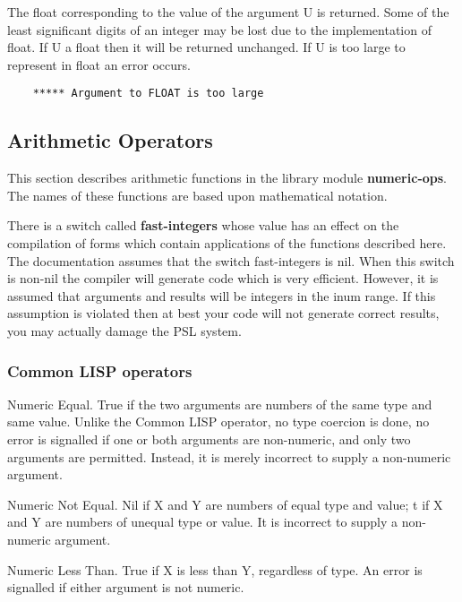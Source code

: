 {    The  float  corresponding  to the value of the argument U is
    returned.  Some  of  the  least  significant  digits  of  an
    integer  may be lost due to the implementation of float.  If
    U a float then it will be returned unchanged.  If U  is  too
    large to represent in float an error occurs.
}
\begin{verbatim}
    ***** Argument to FLOAT is too large
\end{verbatim}
\subsection{Arithmetic Operators}

 This section describes arithmetic functions in the library
module {\bf numeric-ops}. The names of these functions are
based upon mathematical notation.

\noindent
There  is  a  switch  called  {\bf fast-integers} 
whose value has an
effect on the compilation of forms which contain applications of
the functions described here.  The  documentation  assumes  that
the  switch  fast-integers  is nil.  When this switch is non-nil
the  compiler  will  generate  code  which  is  very  efficient.
However,    it  is  assumed  that  arguments and results will be
integers in the inum range.  If this assumption is violated then
at best your code will not generate  correct  results,  you  may
actually  damage  the  PSL system. 

\subsubsection{Common LISP operators}


{    Numeric Equal.  True if the two arguments are numbers of the
    same type and same value.  Unlike the Common LISP  operator,
    no  type  coercion  is done, no error is signalled if one or
    both arguments are non-numeric, and only two  arguments  are
    permitted.    Instead,  it  is  merely incorrect to supply a
    non-numeric argument.
}

{    Numeric Not Equal.  Nil if X and Y are numbers of equal type
    and value; t if X and Y  are  numbers  of  unequal  type  or
    value.  It is incorrect to supply a non-numeric argument.
}

{    Numeric  Less Than.  True if X is less than Y, regardless of
    type.  An error is  signalled  if  either  argument  is  not
    numeric.  }

